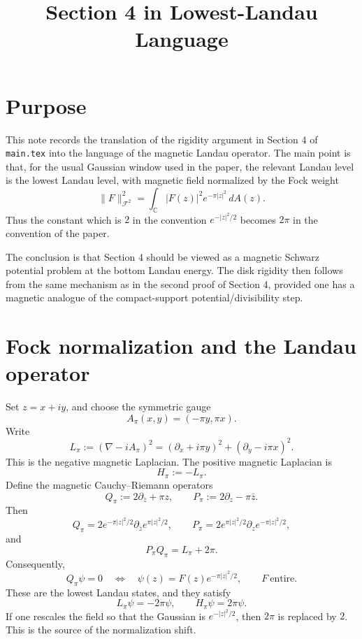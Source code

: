 \documentclass[11pt]{article}
\title{Section 4 in Lowest-Landau Language}
\author{}
\date{}
\newcommand{\C}{\mathbb C}
\newcommand{\1}{\mathbf 1}
\newcommand{\ddA}{\,dA}
\newcommand{\dz}{\partial_z}
\newcommand{\dbz}{\partial_{\bar z}}
\begin{document}
\maketitle

\section{Purpose}

This note records the translation of the rigidity argument in Section 4 of
\texttt{main.tex} into the language of the magnetic Landau operator.  The main
point is that, for the usual Gaussian window used in the paper, the relevant
Landau level is the lowest Landau level, with magnetic field normalized by the
Fock weight
\[
        \|F\|_{\mathcal F^2}^2
        =\int_{\C}|F(z)|^2 e^{-\pi |z|^2}\ddA(z).
\]
Thus the constant which is \(2\) in the convention
\(e^{-|z|^2/2}\) becomes \(2\pi\) in the convention of the paper.

The conclusion is that Section 4 should be viewed as a magnetic Schwarz
potential problem at the bottom Landau energy.  The disk rigidity then follows
from the same mechanism as in the second proof of Section 4, provided one has
a magnetic analogue of the compact-support potential/divisibility step.

\section{Fock normalization and the Landau operator}

Set \(z=x+iy\), and choose the symmetric gauge
\[
        A_\pi(x,y)=(-\pi y,\pi x).
\]
Write
\[
        L_\pi:=(\nabla-iA_\pi)^2
        =(\partial_x+i\pi y)^2+(\partial_y-i\pi x)^2.
\]
This is the negative magnetic Laplacian.  The positive magnetic Laplacian is
\[
        H_\pi:=-L_\pi.
\]
Define the magnetic Cauchy--Riemann operators
\[
        Q_\pi:=2\dbz+\pi z,
        \qquad
        P_\pi:=2\dz-\pi\bar z .
\]
Then
\[
        Q_\pi=2e^{-\pi |z|^2/2}\dbz e^{\pi |z|^2/2},
        \qquad
        P_\pi=2e^{\pi |z|^2/2}\dz e^{-\pi |z|^2/2},
\]
and
\begin{equation}\label{eq:factorization}
        P_\pi Q_\pi=L_\pi+2\pi .
\end{equation}
Consequently,
\[
        Q_\pi \psi=0
        \quad\Longleftrightarrow\quad
        \psi(z)=F(z)e^{-\pi |z|^2/2},
        \qquad F \ \text{entire}.
\]
These are the lowest Landau states, and they satisfy
\[
        L_\pi\psi=-2\pi\psi,
        \qquad
        H_\pi\psi=2\pi\psi.
\]
If one rescales the field so that the Gaussian is \(e^{-|z|^2/2}\), then
\(2\pi\) is replaced by \(2\).  This is the source of the normalization shift.
\end{document}

